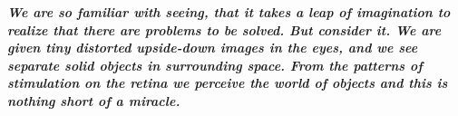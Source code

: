 \thispagestyle{empty}
\hbox{} \vfill
\begin{flushright}
\small \textit{\textbf{We are so familiar with seeing, that it takes a leap of imagination to realize that there are problems to be solved. But consider it. We are given tiny distorted upside-down images in the eyes, and we see separate solid objects in surrounding space. From the patterns of stimulation on the retina we perceive the world of objects and this is nothing short of a miracle.}}
\\ \vspace{2mm}  
\end{flushright}

\clearpage
\thispagestyle{empty}
\cleardoublepage